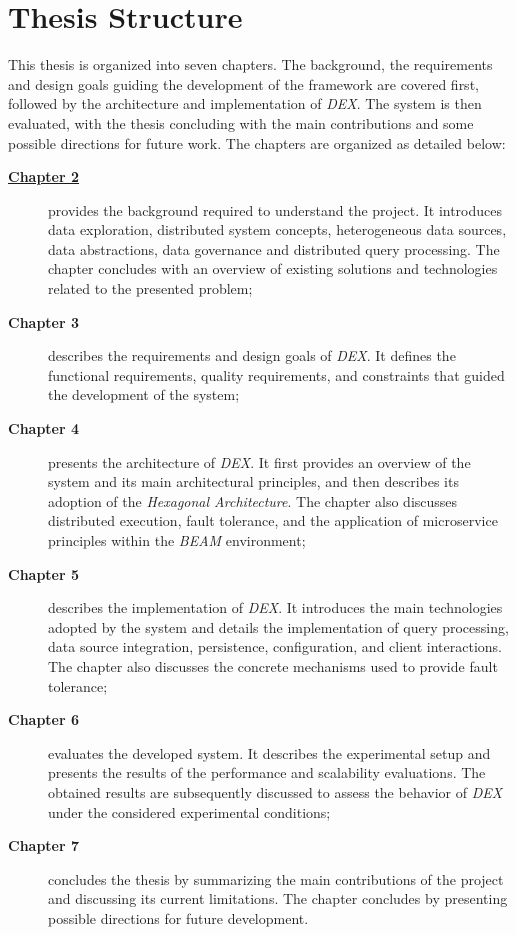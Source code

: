 
\section{Thesis Structure}
This thesis is organized into seven chapters. The background, the
requirements and design goals guiding the development of the framework are
covered first, followed by the architecture and implementation of \textit{DEX}.
The system is then evaluated, with the thesis concluding with the main 
contributions and some possible directions for future work. The chapters are 
organized as detailed below: 

\begin{description}
      \item[{\hyperref[chap:background]{\textbf{Chapter 2}}}] provides the
      background required to understand the project. It introduces data
      exploration, distributed system concepts, heterogeneous data sources, data
      abstractions, data governance and distributed query processing. The chapter
      concludes with an overview of existing solutions and technologies related
      to the presented problem; 
      \item[\textbf{Chapter 3}] describes the requirements and design goals of
      \textit{DEX}. It defines the functional requirements, quality
      requirements, and constraints that guided the development of the system;
      \item[\textbf{Chapter 4}] presents the architecture of \textit{DEX}. It
      first provides an overview of the system and its main architectural
      principles, and then describes its adoption of the \textit{Hexagonal
      Architecture}. The chapter also discusses distributed execution, fault
      tolerance, and the application of microservice principles within the
      \textit{BEAM} environment; 
      \item[\textbf{Chapter 5}] describes the implementation of \textit{DEX}. It 
      introduces the main technologies adopted by the system and details the
      implementation of query processing, data source integration, persistence,
      configuration, and client interactions. The chapter also discusses the
      concrete mechanisms used to provide fault tolerance;
      \item[\textbf{Chapter 6}] evaluates the developed system. It describes the
      experimental setup and presents the results of the performance and
      scalability evaluations. The obtained results are subsequently discussed
      to assess the behavior of \textit{DEX} under the considered experimental
      conditions;
      \item[\textbf{Chapter 7}] concludes the thesis by summarizing the main
      contributions of the project and discussing its current limitations. The
      chapter concludes by presenting possible directions for future
      development.
\end{description}

